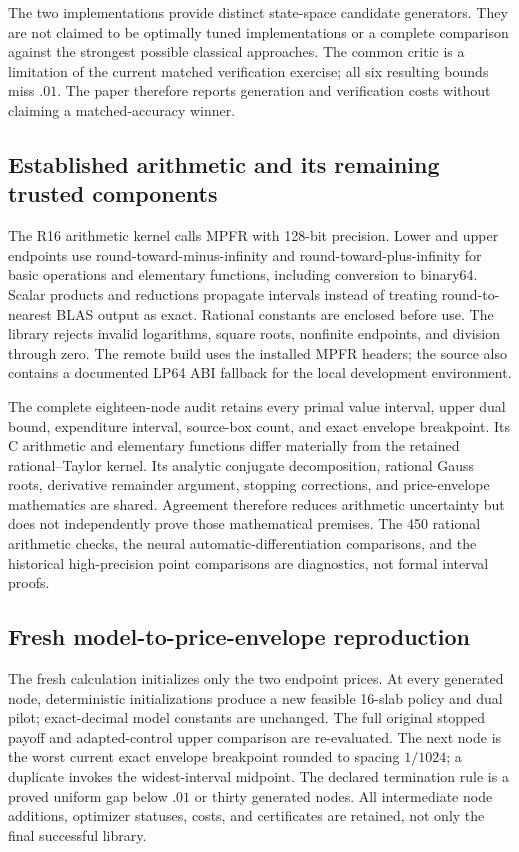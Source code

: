 The two implementations provide distinct state-space candidate generators. They are not claimed to be optimally tuned implementations or a complete comparison against the strongest possible classical approaches. The common critic is a limitation of the current matched verification exercise; all six resulting bounds miss $.01$. The paper therefore reports generation and verification costs without claiming a matched-accuracy winner.

\subsection{Established arithmetic and its remaining trusted components}
The R16 arithmetic kernel calls MPFR with 128-bit precision. Lower and upper endpoints use round-toward-minus-infinity and round-toward-plus-infinity for basic operations and elementary functions, including conversion to binary64. Scalar products and reductions propagate intervals instead of treating round-to-nearest BLAS output as exact. Rational constants are enclosed before use. The library rejects invalid logarithms, square roots, nonfinite endpoints, and division through zero. The remote build uses the installed MPFR headers; the source also contains a documented LP64 ABI fallback for the local development environment.

The complete eighteen-node audit retains every primal value interval, upper dual bound, expenditure interval, source-box count, and exact envelope breakpoint. Its C arithmetic and elementary functions differ materially from the retained rational--Taylor kernel. Its analytic conjugate decomposition, rational Gauss roots, derivative remainder argument, stopping corrections, and price-envelope mathematics are shared. Agreement therefore reduces arithmetic uncertainty but does not independently prove those mathematical premises. The 450 rational arithmetic checks, the neural automatic-differentiation comparisons, and the historical high-precision point comparisons are diagnostics, not formal interval proofs.



\subsection{Fresh model-to-price-envelope reproduction}
The fresh calculation initializes only the two endpoint prices. At every generated node, deterministic initializations produce a new feasible 16-slab policy and dual pilot; exact-decimal model constants are unchanged. The full original stopped payoff and adapted-control upper comparison are re-evaluated. The next node is the worst current exact envelope breakpoint rounded to spacing $1/1024$; a duplicate invokes the widest-interval midpoint. The declared termination rule is a proved uniform gap below $.01$ or thirty generated nodes. All intermediate node additions, optimizer statuses, costs, and certificates are retained, not only the final successful library.


